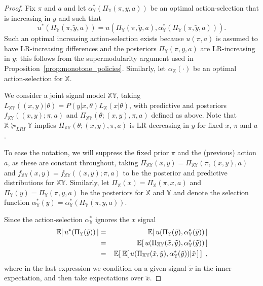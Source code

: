 \documentclass[11pt,onecolumn]{article}
\theoremstyle{plain}
\newcommand{\ev}[1]{\hspace{+0.20ex}\mathbb{E}\hspace{-0.40ex}\left[ \, #1 \, \right]}
\newcommand{\iX}[0]{{\mathbb{X}}}
\newcommand{\iY}[0]{{\mathbb{Y}}}
\newcommand{\iXY}[0]{{\mathbb{XY}}}
\begin{document}
\begin{proof} \singlespacing
Fix $\pi$ and $a$ and let $\alpha_\iY^*(\Pi_\iY(\pi, y,a))$ be an optimal action-selection that is increasing in $y$ and such that
$$u^*(\Pi_\iY(\pi,\tilde{y},a)) = u(\Pi_\iY(\pi,\tilde{y},a),\alpha_\iY^*(\Pi_\iY(\pi, \tilde{y},a))).$$
Such an optimal increasing action-selection exists because $u(\pi,a)$ is assumed to have LR-increasing differences and the posteriors $\Pi_\iY(\pi,y,a)$ are LR-increasing in $y$; this follows from the supermodularity argument used in Proposition~\ref{prop:monotone_policies}. Similarly, let $\alpha_\iX(\cdot)$ be an optimal action-selection for $\iX$.

We consider a joint signal model $\iXY$, taking $L_\iXY( (x,y) | \theta) = P(y|x,\theta) L_\iX(x|\theta)$, with predictive and posteriors $f_\iXY((x,y); \pi,a)$ and $\Pi_\iXY(\theta; (x,y),\pi,a)$ defined as above. Note that $\iX \succeq_{LRI} \iY$ implies $\Pi_\iXY(\theta; (x,y),\pi,a)$ is LR-decreasing in $y$ for fixed $x$, $\pi$ and $a$.

To ease the notation, we will suppress the fixed prior $\pi$ and the (previous) action $a$, as these are constant throughout, taking $\Pi_\iXY(x,y) = \Pi_\iXY(\pi,(x,y),a)$ and $f_\iXY(x,y) = f_\iXY((x,y); \pi,a)$ to be the posterior and predictive distributions for $\iXY$. Similarly, let $\Pi_\iX(x) = \Pi_\iX(\pi,x,a)$ and $\Pi_\iY(y) = \Pi_\iY(\pi,y,a)$ be the posteriors for $\iX$ and $\iY$ and denote the selection function $\alpha_\iY^*(y)=\alpha_\iY^*(\Pi_\iY(\pi, y,a))$.

Since the action-selection $\alpha_\iY^*$ ignores the $x$ signal
\begin{eqnarray}
\ev{u^*(\Pi_\iY(\tilde{y}))} &=& \ev{u(\Pi_\iY(\tilde{y}),\alpha_\iY^*(\tilde{y}))} \\&=& \ev{u(\Pi_\iXY(\tilde{x},\tilde{y}),\alpha_\iY^*(\tilde{y}))} \nonumber \\
&=& \ev{\ev{u(\Pi_\iXY(\tilde{x},\tilde{y}),\alpha_\iY^*(\tilde{y})) | \tilde{x}}} \ ,\label{eq:nested_expectation}
\end{eqnarray}
where in the last expression we condition on a given signal $\tilde{x}$ in the inner expectation, and then take expectations over $\tilde{x}$.


\end{proof}
\end{document}
